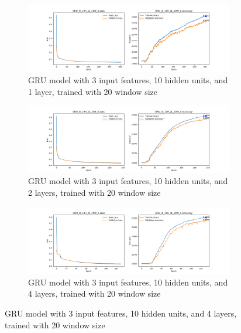 \documentclass{article}
\begin{document}
    \begin{figure}[ht]
        \centering
        \begin{subfigure}
            {\textwidth}
            \centering
            \includegraphics[width=\textwidth]{GRU_3I_10H_1L_20W_A_GRAPH.png}
            \caption{GRU model with 3 input features, 10 hidden units, and 1
            layer, trained with 20 window size}
            \label{fig:GRU_3I_10H_1L_20W_A_GRAPH}
        \end{subfigure}
        \begin{subfigure}
            {\textwidth}
            \centering
            \includegraphics[width=\textwidth]{GRU_3I_10H_2L_20W_A_GRAPH.png}
            \caption{GRU model with 3 input features, 10 hidden units, and 2
            layers, trained with 20 window size}
            \label{fig:GRU_3I_10H_2L_20W_A_GRAPH}
        \end{subfigure}
        \begin{subfigure}
            {\textwidth}
            \centering
            \includegraphics[width=\textwidth]{GRU_3I_10H_4L_20W_A_GRAPH.png}
            \caption{GRU model with 3 input features, 10 hidden units, and 4
            layers, trained with 20 window size}

\end{subfigure}
\end{figure}
\end{document}
